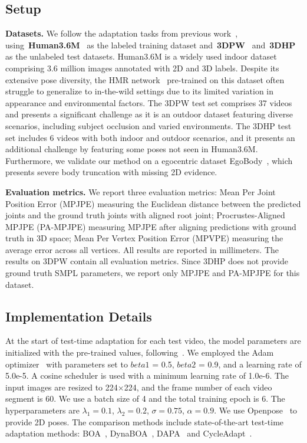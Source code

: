 \subsection{Setup}
\noindent\textbf{Datasets.}
We follow the adaptation tasks from previous work~\cite{iso, cycleadapt}, using~\textbf{Human3.6M}~\cite{human36m} as the labeled training dataset and~\textbf{3DPW}~\cite{3dpw} and~\textbf{3DHP}~\cite{3dhp} as the unlabeled test datasets.
Human3.6M is a widely used indoor dataset comprising 3.6 million images annotated with 2D and 3D labels. 
Despite its extensive pose diversity, the HMR network~\cite{hmrnet} pre-trained on this dataset often struggle to generalize to in-the-wild settings due to its limited variation in appearance and environmental factors. 
The 3DPW test set comprises 37 videos and presents a significant challenge as it is an outdoor dataset featuring diverse scenarios, including subject occlusion and varied environments. 
The 3DHP test set includes 6 videos with both indoor and outdoor scenarios, and it presents an additional challenge by featuring some poses not seen in Human3.6M.
Furthermore, we validate our method on a egocentric dataset EgoBody~\cite{Zhang:ECCV:2022}, which presents severe body truncation with missing 2D evidence.

\noindent\textbf{Evaluation metrics.}
We report three evaluation metrics: Mean Per Joint Position Error (MPJPE) measuring the Euclidean distance between the predicted joints and the ground truth joints with aligned root joint; Procrustes-Aligned MPJPE (PA-MPJPE) measuring MPJPE after aligning predictions with ground truth in 3D space; Mean Per Vertex Position Error (MPVPE) measuring the average error across all vertices. All results are reported in millimeters. The results on 3DPW contain all evaluation metrics. Since 3DHP does not provide ground truth SMPL parameters, we report only MPJPE and PA-MPJPE for this dataset.

\subsection{Implementation Details}
At the start of test-time adaptation for each test video, the model parameters are initialized with the pre-trained values, following~\cite{cycleadapt}. We employed the Adam optimizer~\cite{adam} with parameters set to $beta1$ = 0.5, $beta2$ = 0.9, and a learning rate of 5.0e-5. A cosine scheduler is used with a minimum learning rate of 1.0e-6. The input images are resized to 224$\times$224, and the frame number of each video segment is 60. We use a batch size of 4 and the total training epoch is 6. The hyperparameters are $\lambda_1=0.1$, $\lambda_2=0.2$, $\sigma=0.75$, $\alpha=0.9$. We use Openpose~\cite{openpose} to provide 2D poses. The comparison methods include state-of-the-art
test-time adaptation methods: BOA~\cite{boa}, DynaBOA~\cite{dynaboa}, DAPA~\cite{DAPA} and CycleAdapt~\cite{cycleadapt}.

